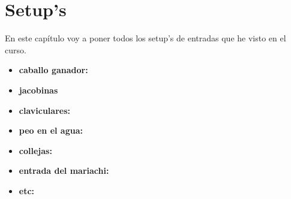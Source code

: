 
\chapter{Setup's}  %

En este capítulo voy a poner todos los setup's de entradas que he visto en el curso.

\begin{itemize}
    \item \textbf{caballo ganador:}

    \item \textbf{jacobinas}

    \item \textbf{claviculares:}

    \item \textbf{peo en el agua:}

    \item \textbf{collejas:}
    
    \item \textbf{entrada del mariachi:}
    
    \item \textbf{etc:}
\end{itemize}